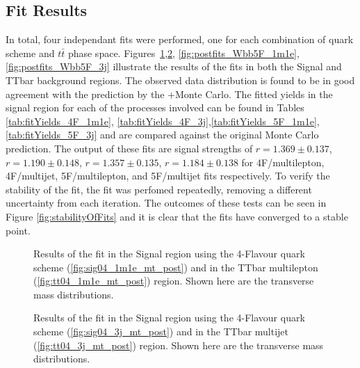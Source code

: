 \subsection{Fit Results \label{sec:SignalExtraction}}

In total, four independant fits were performed, one for each combination of
 \Wbb quark scheme and $t\bar{t}$ phase space.
Figures~\ref{fig:postfits_Wbb4F_1m1e},\ref{fig:postfits_Wbb4F_3j},
 \ref{fig:postfits_Wbb5F_1m1e},\ref{fig:postfits_Wbb5F_3j} 
 illustrate the results of the
 fits in both the Signal and TTbar background regions. 
The observed data distribution is found to be in
 good agreement with the prediction by the \MADGRAPH+\PYTHIA Monte Carlo. 
The fitted yields in the signal region for each of the processes
 involved can be found in Tables \ref{tab:fitYields_4F_1m1e},
 \ref{tab:fitYields_4F_3j},\ref{tab:fitYields_5F_1m1e},\ref{tab:fitYields_5F_3j}
 and are compared against the original Monte Carlo prediction. 
The output of these fits are signal strengths of $r=1.369\pm0.137$,
 $r=1.190\pm0.148$, $r=1.357\pm0.135$, $r=1.184\pm0.138$ for 
 4F/multilepton, 4F/multijet, 5F/multilepton, and 5F/multijet fits respectively. 
To verify the stability of the fit, the fit was perfomed repeatedly,
 removing a different uncertainty from each iteration. 
The outcomes of these tests can be seen in Figure \ref{fig:stabilityOfFits}
  and it is clear that the fits have converged to a stable point.

\begin{figure}[htb]
\center
{}
\caption{Results of the fit in the Signal region using the 4-Flavour quark scheme (\ref{fig:sig04_1m1e_mt_post})
 and in the TTbar multilepton (\ref{fig:tt04_1m1e_mt_post}) region.
 Shown here are the transverse mass distributions.}
\label{fig:postfits_Wbb4F_1m1e}
\end{figure}

\begin{figure}[htb]
\center
{}
\caption{Results of the fit in the Signal region using the 4-Flavour quark scheme (\ref{fig:sig04_3j_mt_post})
 and in the TTbar multijet (\ref{fig:tt04_3j_mt_post}) region.
 Shown here are the transverse mass distributions.}
\label{fig:postfits_Wbb4F_3j}
\end{figure}

